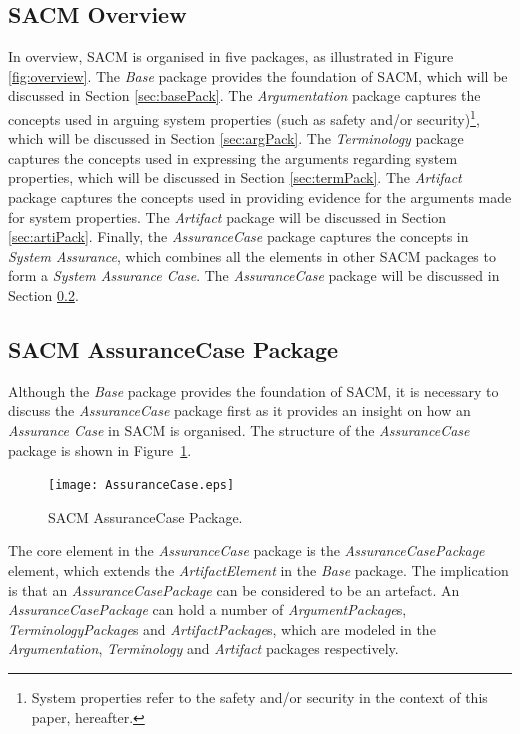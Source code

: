 \subsection{SACM Overview}
In overview, SACM is organised in five packages, as illustrated in Figure \ref{fig:overview}. The \textit{Base} package provides the foundation of SACM, which will be discussed in Section \ref{sec:basePack}. The \textit{Argumentation} package captures the concepts used in arguing system properties (such as safety and/or security)\footnote{System properties refer to the safety and/or security in the context of this paper, hereafter.}, which will be discussed in Section \ref{sec:argPack}. The \textit{Terminology} package captures the concepts used in expressing the arguments regarding system properties, which will be discussed in Section \ref{sec:termPack}. The \textit{Artifact} package captures the concepts used in providing evidence for the arguments made for system properties. The \textit{Artifact} package will be discussed in Section \ref{sec:artiPack}. Finally, the \textit{AssuranceCase} package captures the concepts in \textit{System Assurance}, which combines all the elements in other SACM packages to form a \textit{System Assurance Case}. The \textit{AssuranceCase} package will be discussed in Section \ref{sec:acPack}.

\subsection{SACM AssuranceCase Package}
\label{sec:acPack}
Although the \textit{Base} package provides the foundation of SACM, it is necessary to discuss the \textit{AssuranceCase} package first as it provides an insight on how an \textit{Assurance Case} in SACM is organised. The structure of the \textit{AssuranceCase} package is shown in Figure~\ref{fig:ac}.

\begin{figure}
	\centering
	\texttt{[image: AssuranceCase.eps]}
	\caption{SACM AssuranceCase Package.}
	\label{fig:ac}
\end{figure}

The core element in the \textit{AssuranceCase} package is the \textit{AssuranceCasePackage} element, which extends the \textit{ArtifactElement} in the \textit{Base} package. The implication is that an \textit{AssuranceCasePackage} can be considered to be an artefact. An \textit{AssuranceCasePackage} can hold a number of \textit{ArgumentPackage}s, \textit{TerminologyPackage}s and \textit{ArtifactPackage}s, which are modeled in the \textit{Argumentation}, \textit{Terminology} and \textit{Artifact} packages respectively.

